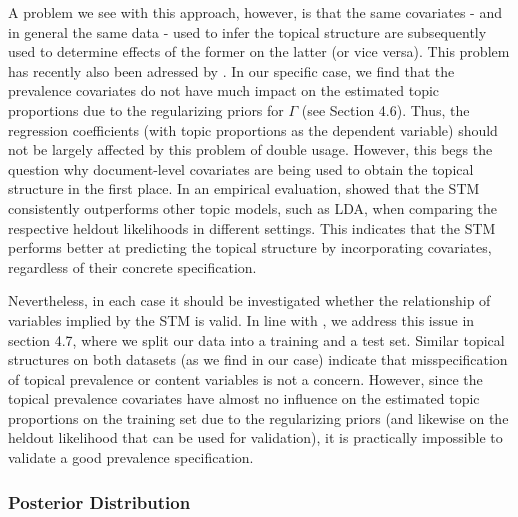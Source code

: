 \documentclass[12pt]{article}
\begin{document}
A problem we see with this approach, however, is that the same covariates - and in general the same data - used to infer the topical structure are subsequently used to determine effects of the former on the latter (or vice versa). This problem has recently also been adressed by \cite{egami2018make}. In our specific case, we find that the prevalence covariates do not have much impact on the estimated topic proportions due to the regularizing priors for $\Gamma$ (see Section 4.6). Thus, the regression coefficients (with topic proportions as the dependent variable) should not be largely affected by this problem of double usage. However, this begs the question why document-level covariates are being used to obtain the topical structure in the first place. In an empirical evaluation, \cite{roberts2016model} showed that the STM consistently outperforms other topic models, such as LDA, when comparing the respective heldout likelihoods in different settings. This indicates that the STM performs better at predicting the topical structure by incorporating covariates, regardless of their concrete specification.

Nevertheless, in each case it should be investigated whether the relationship of variables implied by the STM is valid. In line with \cite{egami2018make}, we address this issue in section 4.7, where we split our data into a training and a test set. Similar topical structures on both datasets (as we find in our case) indicate that misspecification of topical prevalence or content variables is not a concern. However, since the topical prevalence covariates have almost no influence on the estimated topic proportions on the training set due to the regularizing priors (and likewise on the heldout likelihood that can be used for validation), it is practically impossible to validate a good prevalence specification.

\subsubsection*{Posterior Distribution}
\end{document}
